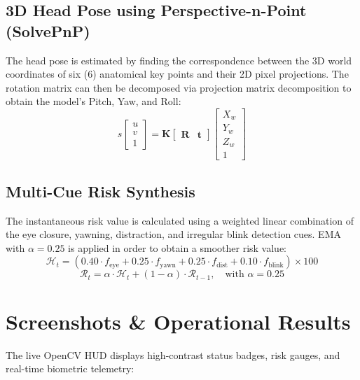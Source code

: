 \documentclass[11pt,a4paper]{article}
\begin{document}
\subsection{3D Head Pose using Perspective-n-Point (SolvePnP)}
The head pose is estimated by finding the correspondence between the 3D world coordinates of six (6) anatomical key points and their 2D pixel projections. The rotation matrix can then be decomposed via projection matrix decomposition to obtain the model's Pitch, Yaw, and Roll:
\begin{equation}
s \begin{bmatrix} u \\ v \\ 1 \end{bmatrix} = \mathbf{K} \begin{bmatrix} \mathbf{R} & \mathbf{t} \end{bmatrix} \begin{bmatrix} X_w \\ Y_w \\ Z_w \\ 1 \end{bmatrix}
\end{equation}

\subsection{Multi-Cue Risk Synthesis}
The instantaneous risk value is calculated using a weighted linear combination of the eye closure, yawning, distraction, and irregular blink detection cues. EMA with $\alpha = 0.25$ is applied in order to obtain a smoother risk value:
\begin{equation}
\mathcal{H}_t = \left( 0.40 \cdot f_{\text{eye}} + 0.25 \cdot f_{\text{yawn}} + 0.25 \cdot f_{\text{dist}} + 0.10 \cdot f_{\text{blink}} \right) \times 100
\end{equation}
\begin{equation}
\mathcal{R}_t = \alpha \cdot \mathcal{H}_t + (1 - \alpha) \cdot \mathcal{R}_{t-1}, \quad \text{with } \alpha = 0.25
\end{equation}

\section{Screenshots \& Operational Results}
The live OpenCV HUD displays high-contrast status badges, risk gauges, and real-time biometric telemetry:
\end{document}
